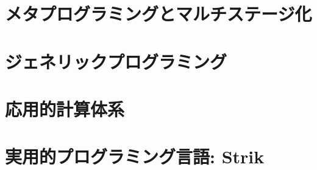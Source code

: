 \documentclass[
  luatex,
  japanese,
  unicode,
  titlepage,
  pdfusetitle
]{ltjsbook}
\begin{document}
\chapter{メタプログラミングとマルチステージ化}

\chapter{ジェネリックプログラミング}

\chapter{応用的計算体系}

\chapter{実用的プログラミング言語: Strik}







\end{document}
